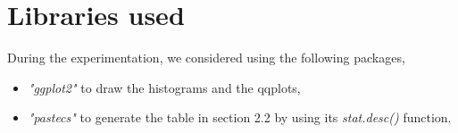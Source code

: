 \documentclass[12pt]{article}
\begin{document}
		\section{Libraries used}
			During the experimentation, we considered using the following packages,
			\begin{itemize}
				\item \textit{"ggplot2"} to draw the histograms and the qqplots,
				\item \textit{"pastecs"} to generate the table in section 2.2 by using its \textit{stat.desc()} function. 
			\end{itemize}
		
			
	
	
\end{document}
